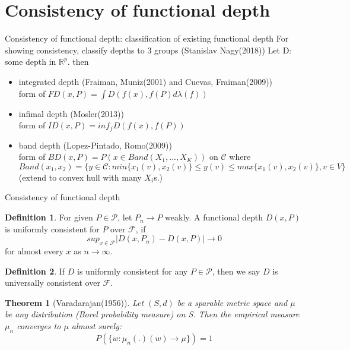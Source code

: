 \documentclass[aspectratio=169,ignorenonframetext,9pt]{beamer}
\theoremstyle{plain}
\newtheorem{thm}{Theorem}[section]
\theoremstyle{definition}
\newtheorem{defn}{Definition}[section]
\begin{document}
\section{Consistency of functional depth}
\begin{frame}{Consistency of functional depth: classification of existing functional depth}
    For showing consistency, classify depths to 3 groups (Stanislav Nagy(2018))
    Let D: some depth in $\mathbb{R}^p$. then
    \begin{itemize}
        \item integrated depth (Fraiman, Muniz(2001) and  Cuevas, Fraiman(2009)) \\
        form of \(FD(x,P)=\int D(f(x),f(P)d\lambda(f))\)
        \item infimal depth (Mosler(2013))\\
        form of \(ID(x,P)=inf_f D(f(x),f(P))\)
        \item band depth (Lopez-Pintado, Romo(2009))\\
        form of \(BD(x,P)=P(x\in Band(X_1,...,X_K))\) on $\mathcal{C}$
        where $Band(x_1,x_2)=\{y\in\mathcal{C}: min\{x_1(v),x_2(v)\} \leq y(v) \leq max\{x_1(v),x_2(v)\}, v\in V\}$ \\
        (extend to convex hull with many $X_i$s.)
    \end{itemize}
\end{frame}

\begin{frame}{Consistency of functional depth}
    \begin{defn}
        For given $P\in\mathcal{P}$, let $P_n\rightarrow P$ weakly.
        A functional depth $D(x,P)$ is uniformly consistent for $P$ over $\mathcal{F}$,
        if
        \[sup_{x\in\mathcal{F}}|D(x,P_n)-D(x,P)|\rightarrow 0\]
        for almost every $x$ as $n\rightarrow\infty$.
    \end{defn}
    \begin{defn}
        If $D$ is uniformly consistent for any $P\in\mathcal{P}$,
        then we say $D$ is universally consistent over $\mathcal{F}$.
    \end{defn}
    \begin{thm}[Varadarajan(1956)]
        Let $(S,d)$ be a sparable metric space and $\mu$ be any distribution (Borel probability measure) on S.
        Then the empirical measure $\mu_n$ converges to $\mu$ almost surely:
        \[P(\{w:\mu_n(.)(w)\rightarrow\mu\})=1\]
    \end{thm}
\end{frame}
\end{document}
